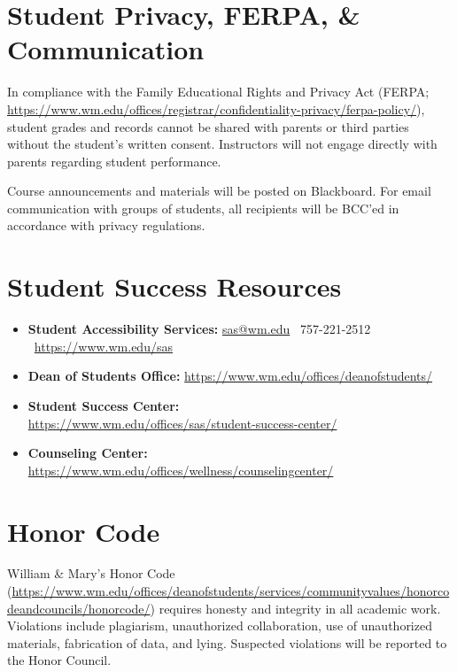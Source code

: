 \documentclass[11pt, letterpaper]{article}
\begin{document}
\section{Student Privacy, FERPA, \& Communication}
In compliance with the Family Educational Rights and Privacy Act (FERPA; \url{https://www.wm.edu/offices/registrar/confidentiality-privacy/ferpa-policy/}), student grades and records cannot be shared with parents or third parties without the student's written consent. Instructors will not engage directly with parents regarding student performance.

Course announcements and materials will be posted on Blackboard. For email communication with groups of students, all recipients will be BCC'ed in accordance with privacy regulations.

\section{Student Success Resources}
\label{sec:ssr}
\begin{itemize}
    \item \textbf{Student Accessibility Services:} \href{mailto:sas@wm.edu}{sas@wm.edu} \textbar\ 757-221-2512 \textbar\ \url{https://www.wm.edu/sas}
    \item \textbf{Dean of Students Office:} \url{https://www.wm.edu/offices/deanofstudents/}
    \item \textbf{Student Success Center:}\\ \url{https://www.wm.edu/offices/sas/student-success-center/}
    \item \textbf{Counseling Center:} \url{https://www.wm.edu/offices/wellness/counselingcenter/}
\end{itemize}

\section{Honor Code}
William \& Mary's Honor Code (\url{https://www.wm.edu/offices/deanofstudents/services/communityvalues/honorcodeandcouncils/honorcode/}) requires honesty and integrity in all academic work. Violations include plagiarism, unauthorized collaboration, use of unauthorized materials, fabrication of data, and lying. Suspected violations will be reported to the Honor Council.
\end{document}
